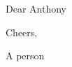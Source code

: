 \documentclass{dragonfly-letter}
\begin{document}
\maketitle

Dear Anthony

\lipsum[1-7]

Cheers,

A person
\end{document}
